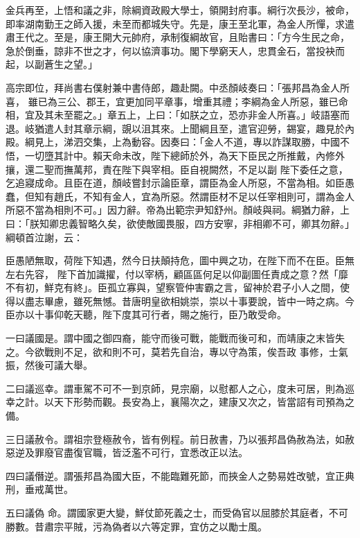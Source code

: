 \begin{pinyinscope}
 金兵再至，上悟和議之非，除綱資政殿大學士，領開封府事。綱行次長沙，被命，即率湖南勤王之師入援，未至而都城失守。先是，康王至北軍，為金人所憚，求遣肅王代之。至是，康王開大元帥府，承制復綱故官，且貽書曰：「方今生民之命，急於倒垂，諒非不世之才，何以協濟事功。閣下學窮天人，忠貫金石，當投袂而起，以副蒼生之望。」



 高宗即位，拜尚書右僕射兼中書侍郎，趣赴闕。中丞顏岐奏曰：「張邦昌為金人所喜，
 雖已為三公、郡王，宜更加同平章事，增重其禮；李綱為金人所惡，雖已命相，宜及其未至罷之。」章五上，上曰：「如朕之立，恐亦非金人所喜。」岐語塞而退。岐猶遣人封其章示綱，覬以沮其來。上聞綱且至，遣官迎勞，錫宴，趣見於內殿。綱見上，涕泗交集，上為動容。因奏曰：「金人不道，專以詐謀取勝，中國不悟，一切墮其計中。賴天命未改，陛下總師於外，為天下臣民之所推戴，內修外攘，還二聖而撫萬邦，責在陛下與宰相。臣自視闕然，不足以副
 陛下委任之意，乞追寢成命。且臣在道，顏岐嘗封示論臣章，謂臣為金人所惡，不當為相。如臣愚蠢，但知有趙氏，不知有金人，宜為所惡。然謂臣材不足以任宰相則可，謂為金人所惡不當為相則不可。」因力辭。帝為出範宗尹知舒州。顏岐與祠。綱猶力辭，上曰：「朕知卿忠義智略久矣，欲使敵國畏服，四方安寧，非相卿不可，卿其勿辭。」綱頓首泣謝，云：



 臣愚陋無取，荷陛下知遇，然今日扶顛持危，圖中興之功，在陛下而不在臣。臣無左右先容，
 陛下首加識擢，付以宰柄，顧區區何足以仰副圖任責成之意？然「靡不有初，鮮克有終」。臣孤立寡與，望察管仲害霸之言，留神於君子小人之間，使得以盡志畢慮，雖死無憾。昔唐明皇欲相姚崇，崇以十事要說，皆中一時之病。今臣亦以十事仰乾天聽，陛下度其可行者，賜之施行，臣乃敢受命。



 一曰議國是。謂中國之御四裔，能守而後可戰，能戰而後可和，而靖康之末皆失之。今欲戰則不足，欲和則不可，莫若先自治，專以守為策，俟吾政
 事修，士氣振，然後可議大舉。



 二曰議巡幸。謂車駕不可不一到京師，見宗廟，以慰都人之心，度未可居，則為巡幸之計。以天下形勢而觀。長安為上，襄陽次之，建康又次之，皆當詔有司預為之備。



 三日議赦令。謂祖宗登極赦令，皆有例程。前日赦書，乃以張邦昌偽赦為法，如赦惡逆及罪廢官盡復官職，皆泛濫不可行，宜悉改正以法。



 四曰議僭逆。謂張邦昌為國大臣，不能臨難死節，而挾金人之勢易姓改號，宜正典刑，垂戒萬世。



 五曰議偽
 命。謂國家更大變，鮮仗節死義之士，而受偽官以屈膝於其庭者，不可勝數。昔肅宗平賊，污為偽者以六等定罪，宜仿之以勵士風。




\end{pinyinscope}
